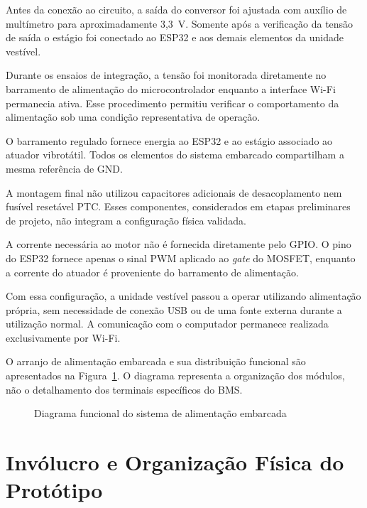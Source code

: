 Antes da conexão ao circuito, a saída do conversor foi ajustada com auxílio de multímetro para aproximadamente 3,3~V. Somente após a verificação da tensão de saída o estágio foi conectado ao ESP32 e aos demais elementos da unidade vestível.

Durante os ensaios de integração, a tensão foi monitorada diretamente no barramento de alimentação do microcontrolador enquanto a interface Wi-Fi permanecia ativa. Esse procedimento permitiu verificar o comportamento da alimentação sob uma condição representativa de operação.

O barramento regulado fornece energia ao ESP32 e ao estágio associado ao atuador vibrotátil. Todos os elementos do sistema embarcado compartilham a mesma referência de GND.

A montagem final não utilizou capacitores adicionais de desacoplamento nem fusível resetável PTC. Esses componentes, considerados em etapas preliminares de projeto, não integram a configuração física validada.

A corrente necessária ao motor não é fornecida diretamente pelo GPIO. O pino do ESP32 fornece apenas o sinal PWM aplicado ao \textit{gate} do MOSFET, enquanto a corrente do atuador é proveniente do barramento de alimentação.

Com essa configuração, a unidade vestível passou a operar utilizando alimentação própria, sem necessidade de conexão USB ou de uma fonte externa durante a utilização normal. A comunicação com o computador permanece realizada exclusivamente por Wi-Fi.

O arranjo de alimentação embarcada e sua distribuição funcional são apresentados na Figura~\ref{fig:diagrama_alimentacao_embarcada}. O diagrama representa a organização dos módulos, não o detalhamento dos terminais específicos do BMS.

\begin{figure}[!htbp]
\centering
\resizebox{0.98\linewidth}{!}{}
\caption{Diagrama funcional do sistema de alimentação embarcada}
\label{fig:diagrama_alimentacao_embarcada}
\end{figure}


\section{Invólucro e Organização Física do Protótipo}
\label{sec:involucro_prototipo}

